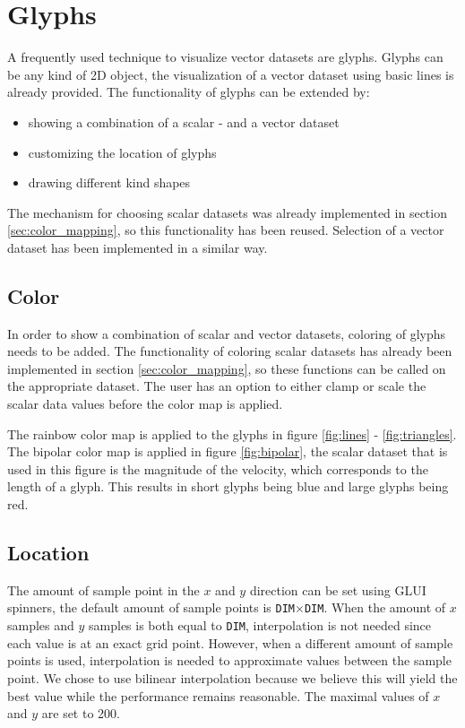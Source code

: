 \section{Glyphs}
	\label{sec:glyphs}
	A frequently used technique to visualize vector datasets are glyphs.
	Glyphs can be any kind of 2D object, the visualization of a vector dataset using basic lines is already provided.
	The functionality of glyphs can be extended by:
	\begin{itemize}
		\item showing a combination of a scalar - and a vector dataset
		\item customizing the location of glyphs
		\item drawing different kind shapes
	\end{itemize}

	The mechanism for choosing scalar datasets was already implemented in section \ref{sec:color_mapping}, so this functionality has been reused. 
	Selection of a vector dataset has been implemented in a similar way. 

	\subsection*{Color}
		In order to show a combination of scalar and vector datasets, coloring of glyphs needs to be added.
		The functionality of coloring scalar datasets has already been implemented in section \ref{sec:color_mapping}, so these functions can be called on the appropriate dataset.
		The user has an option to either clamp or scale the scalar data values before the color map is applied.
		
		The rainbow color map is applied to the glyphs in figure \ref{fig:lines} - \ref{fig:triangles}.
		The bipolar color map is applied in figure \ref{fig:bipolar}, the scalar dataset that is used in this figure is the magnitude of the velocity, which corresponds to the length of a glyph.
		This results in short glyphs being blue and large glyphs being red.  

	\subsection*{Location}
		The amount of sample point in the $x$ and $y$ direction can be set using GLUI spinners, the default amount of sample points is \texttt{DIM}$\times$\texttt{DIM}.
		When the amount of $x$ samples and $y$ samples is both equal to \texttt{DIM}, interpolation is not needed since each value is at an exact grid point.
		However, when a different amount of sample points is used, interpolation is needed to approximate values between the sample point.
		We chose to use bilinear interpolation because we believe this will yield the best value while the performance remains reasonable.
		The maximal values of $x$ and $y$ are set to 200.
